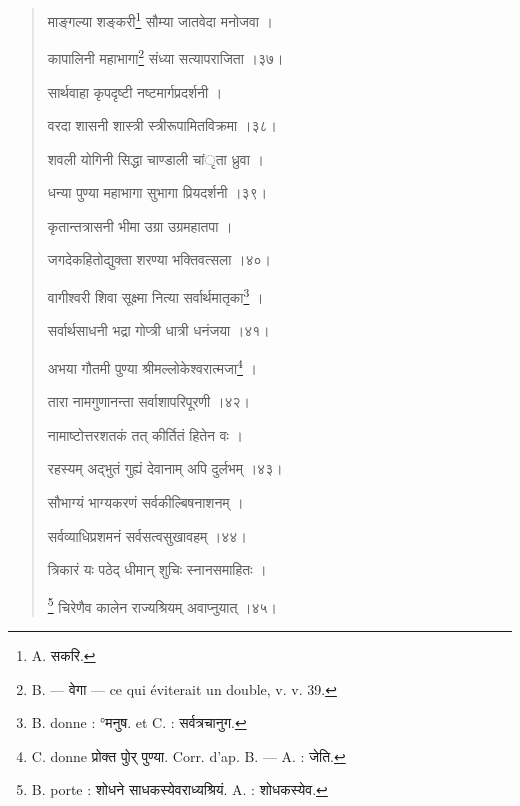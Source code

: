 \documentclass[a4paper, 11pt, oneside, french, landscape, twocolumn]{article}
\begin{document}
\begin{quotation}
\bigskip

\texthindi{माङ्गल्या शङ्करी}\footnote{A. \texthindi{सकरि}.} \texthindi{सौम्या जातवेदा मनोजवा ।}

\texthindi{कापालिनी महाभागा}\footnote{B. --- \texthindi{वेगा} --- ce qui éviterait un double, v. v. 39.} \texthindi{संध्या सत्यापराजिता ।३७।}

\bigskip

\texthindi{सार्थवाहा कृपदृष्टी नष्टमार्गप्रदर्शनी ।}

\texthindi{वरदा शासनी शास्त्री स्त्रीरूपामितविक्रमा ।३८।}

\bigskip

\texthindi{शवली योगिनी सिद्धा चाण्डाली चांृता ध्रुवा ।}

\texthindi{धन्या पुण्या महाभागा सुभागा प्रियदर्शनी ।३९।}

\bigskip

\texthindi{कृतान्तत्रासनी भीमा उग्रा उग्रमहातपा ।}

\texthindi{जगदेकहितोद्युक्ता शरण्या भक्तिवत्सला ।४०।}

\bigskip

\texthindi{वागीश्वरी शिवा सूक्ष्मा नित्या सर्वार्थमातृका}\footnote{B. donne : °\texthindi{मनुष.} et C. : \texthindi{सर्वत्रचानुग.}} \texthindi{।}

\texthindi{सर्वार्थसाधनी भद्रा गोप्त्री धात्री धनंजया ।४१।}

\bigskip

\texthindi{अभया गौतमी पुण्या श्रीमल्लोकेश्वरात्मजा}\footnote{C. donne \texthindi{प्रोक्त पोुर् पुण्या}. Corr. d'ap. B. --- A. : \texthindi{जेति}.} \texthindi{।}

\texthindi{तारा नामगुणानन्ता सर्वाशापरिपूरणी ।४२।}

\bigskip

\texthindi{नामाष्टोत्तरशतकं तत् कीर्तितं हितेन वः ।}

\texthindi{रहस्यम् अद्भुतं गुह्यं देवानाम् अपि दुर्लभम् ।४३।}

\bigskip

\texthindi{सौभाग्यं भाग्यकरणं सर्वकील्बिषनाशनम् ।}

\texthindi{सर्वव्याधिप्रशमनं सर्वसत्वसुखावहम् ।४४।}

\bigskip

\texthindi{त्रिकारं यः पठेद् धीमान् शुचिः स्नानसमाहितः ।}

\footnote{B. porte : \texthindi{शोधने साधकस्येवराध्यश्रियं.} A. : \texthindi{शोधकस्येव.}} \texthindi{चिरेणैव कालेन राज्यश्रियम् अवाप्नुयात् ।४५।}

\bigskip


\end{quotation}
\end{document}
